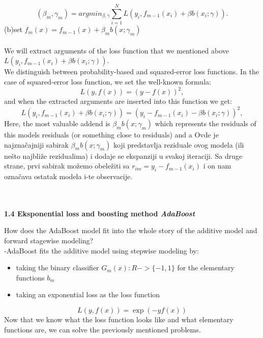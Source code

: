 \documentclass[12pt, letterpaper, twoside]{article}
\begin{document}
\begin{equation*}
(\beta_m,\gamma_m)=argmin_{\beta,\gamma}\sum_{i=1}^N L(y_i,f_{m-1}(x_i)+\beta b(x_i;\gamma)).
\end{equation*}
\hspace*{6ex}(b)\space set $f_m(x)=f_{m-1}(x)+\beta_m b(x;\gamma_m)$\\\\
We will extract arguments of the loss function that we mentioned above $L(y_i,f_{m-1}(x_i)+\beta b(x_i;\gamma))$.\\
We distinguish between probability-based and squared-error loss functions. In the case of squared-error loss function, we set the well-known formula:
\begin{equation*}
L(y,f(x))=(y-f(x))^2,
\end{equation*}
and when the extracted arguments are inserted into this function we get:
\begin{equation*}
L(y_i,f_{m-1}(x_i)+\beta b(x_i;\gamma)) = (y_i-f_{m-1}(x_i)-\beta b(x_i;\gamma))^2,
\end{equation*}
Here, the most valuable addend is $\beta_mb(x;\gamma_m)$ which represents the residuals of this models residuals (or something close to residuals) and a
Ovde je najznačajniji sabirak $\beta_mb(x;\gamma_m)$ koji predstavlja reziduale ovog modela (ili nešto najbliže rezidualima) i dodaje se ekspanziji u svakoj iteraciji. Sa druge strane, prvi sabirak možemo obeležiti sa  $r_{im}=y_i-f_{m-1}(x_i)$ i on nam označava ostatak modela i-te observacije.\\\\
\begin{center}
\textbf{\large{\\1.4 Eksponential loss and boosting method \emph{AdaBoost} }\\}
\end{center}
How does the AdaBoost model fit into the whole story of the additive model and forward stagewise modeling?\\
-AdaBoost fits the additive model using stepwise modeling by:
\begin{itemize}
\item taking the binary classifier $G_m(x):R->\{-1,1\}$ for the elementary functions $b_m$
\item taking an exponential loss as the loss function
\end{itemize}
\begin{equation*}
L(y,f(x))=\exp(-y f(x))
\end{equation*}
Now that we know what the loss function looks like and what elementary functions are, we can solve the previously mentioned problems.
\end{document}
